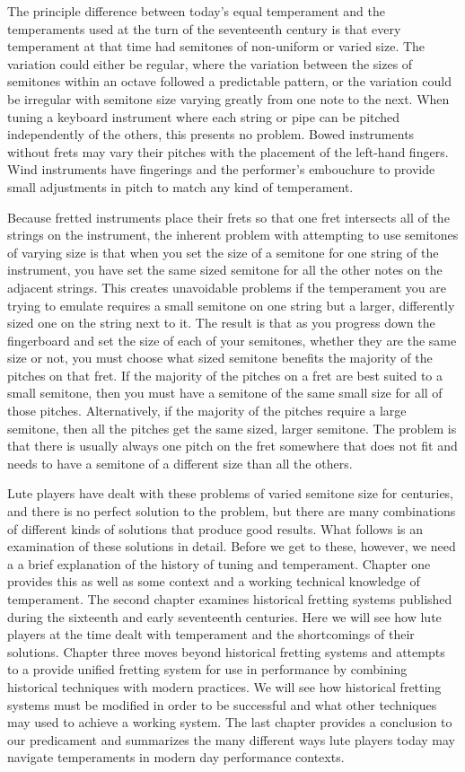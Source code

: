The principle difference between today's equal temperament and the temperaments used at
the turn of the seventeenth century is that every temperament at that time had
semitones of non-uniform or varied size.  The variation could either be regular, where
the variation between the sizes of semitones within an octave followed a predictable
pattern, or the variation could be irregular with semitone size varying greatly from
one note to the next. When tuning a keyboard instrument where each string or pipe can
be pitched independently of the others, this presents no problem.  Bowed instruments
without frets may vary their pitches with the placement of the left-hand fingers.  Wind
instruments have fingerings and the performer's embouchure to provide small adjustments
in pitch to match any kind of temperament.

Because fretted instruments place their frets so that one fret intersects all of the
strings on the instrument, the inherent problem with attempting to use semitones of
varying size is that when you set the size of a semitone for one string of the
instrument, you have set the same sized semitone for all the other notes on the
adjacent strings. This creates unavoidable problems if the temperament you are trying
to emulate requires a small semitone on one string but a larger, differently sized one
on the string next to it. The result is that as you progress down the fingerboard and
set the size of each of your semitones, whether they are the same size or not, you must
choose what sized semitone benefits the majority of the pitches on that fret. If the
majority of the pitches on a fret are best suited to a small semitone, then you must
have a semitone of the same small size for all of those pitches. Alternatively, if the
majority of the pitches require a large semitone, then all the pitches get the same
sized, larger semitone.  The problem is that there is usually always one pitch on the
fret somewhere that does not fit and needs to have a semitone of a different size than
all the others.

Lute players have dealt with these problems of varied semitone size for centuries, and
there is no perfect solution to the problem, but there are many combinations of
different kinds of solutions that produce good results. What follows is an examination
of these solutions in detail.  Before we get to these, however, we need a a brief
explanation of the history of tuning and temperament. Chapter one provides this as well
as some context and a working technical knowledge of temperament. The second chapter
examines historical fretting systems published during the sixteenth and early
seventeenth centuries. Here we will see how lute players at the time dealt with
temperament and the shortcomings of their solutions. Chapter three moves beyond
historical fretting systems and attempts to a provide unified fretting system for use
in performance by combining historical techniques with modern practices.  We will see
how historical fretting systems must be modified in order to be successful and what
other techniques may used to achieve a working system. The last chapter provides a
conclusion to our predicament and summarizes the many different ways lute players today
may navigate temperaments in modern day performance contexts.

